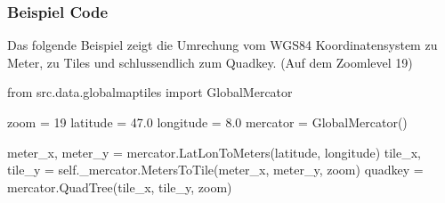 \subsubsection{Beispiel Code}
Das folgende Beispiel zeigt die Umrechung vom WGS84 Koordinatensystem zu Meter, zu Tiles und schlussendlich zum Quadkey. (Auf dem Zoomlevel 19) \\
\begin{python}
from src.data.globalmaptiles import GlobalMercator

zoom = 19
latitude = 47.0
longitude = 8.0
mercator = GlobalMercator()

meter_x, meter_y = mercator.LatLonToMeters(latitude, longitude)
tile_x, tile_y = self._mercator.MetersToTile(meter_x, meter_y, zoom)
quadkey = mercator.QuadTree(tile_x, tile_y, zoom)
\end{python}

